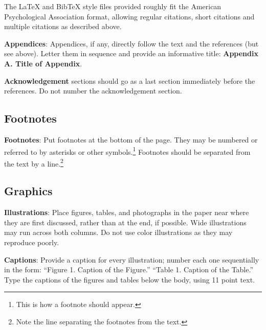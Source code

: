 \documentclass[11pt]{article}
\begin{document}
The \LaTeX{} and Bib\TeX{} style files provided roughly fit the
American Psychological Association format, allowing regular citations, 
short citations and multiple citations as described above.

{\bf Appendices}: Appendices, if any, directly follow the text and the
references (but see above).  Letter them in sequence and provide an
informative title: {\bf Appendix A. Title of Appendix}.

\textbf{Acknowledgement} sections should go as a last section immediately
before the references.  Do not number the acknowledgement section.

\subsection{Footnotes}

{\bf Footnotes}: Put footnotes at the bottom of the page. They may
be numbered or referred to by asterisks or other
symbols.\footnote{This is how a footnote should appear.} Footnotes
should be separated from the text by a line.\footnote{Note the
line separating the footnotes from the text.}

\subsection{Graphics}

{\bf Illustrations}: Place figures, tables, and photographs in the
paper near where they are first discussed, rather than at the end, if
possible.  Wide illustrations may run across both columns. Do not use
color illustrations as they may reproduce poorly.

{\bf Captions}: Provide a caption for every illustration; number each one
sequentially in the form:  ``Figure 1. Caption of the Figure.'' ``Table 1.
Caption of the Table.''  Type the captions of the figures and 
tables below the body, using 11 point text.  




\end{document}
